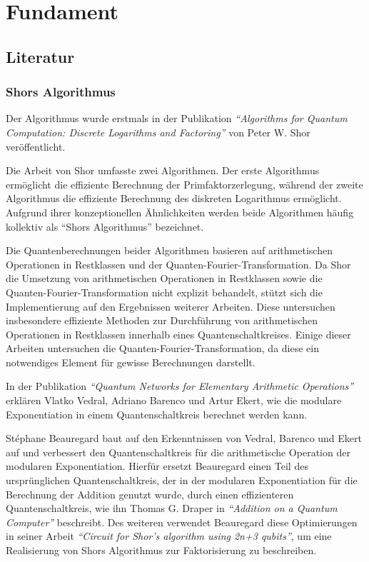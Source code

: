 \section{Fundament}
\subsection{Literatur} 
\subsubsection*{Shors Algorithmus}
Der Algorithmus wurde erstmals in der Publikation \textit{"`Algorithms for Quantum Computation: Discrete Logarithms and Factoring"'} von Peter W. Shor veröffentlicht.

Die Arbeit von Shor umfasste zwei Algorithmen.
Der erste Algorithmus ermöglicht die effiziente Berechnung der Primfaktorzerlegung, 
während der zweite Algorithmus die effiziente Berechnung des diskreten Logarithmus ermöglicht.
Aufgrund ihrer konzeptionellen Ähnlichkeiten werden beide Algorithmen häufig kollektiv als "`Shors Algorithmus"' bezeichnet.

Die Quantenberechnungen beider Algorithmen basieren auf arithmetischen Operationen in Restklassen und der Quanten-Fourier-Transformation.
Da Shor die Umsetzung von arithmetischen Operationen in Restklassen sowie die Quanten-Fourier-Transformation nicht explizit behandelt,
stützt sich die Implementierung auf den Ergebnissen weiterer Arbeiten. 
Diese untersuchen insbesondere effiziente Methoden zur Durchführung von arithmetischen Operationen in Restklassen innerhalb eines Quantenschaltkreises.
Einige dieser Arbeiten untersuchen die Quanten-Fourier-Transformation, 
da diese ein notwendiges Element für gewisse Berechnungen darstellt.

In der Publikation \textit{"`Quantum Networks for Elementary Arithmetic Operations"'} erklären Vlatko Vedral,  Adriano Barenco und Artur Ekert,
wie die modulare Exponentiation in einem Quantenschaltkreis berechnet werden kann. 

St\'{e}phane Beauregard baut auf den Erkenntnissen von Vedral, Barenco und Ekert auf und
verbessert den Quantenschaltkreis für die arithmetische Operation der modularen Exponentiation.
Hierfür ersetzt Beauregard einen Teil des ursprünglichen Quantenschaltkreis,
der in der modularen Exponentiation für die Berechnung der Addition genutzt wurde, 
durch einen effizienteren Quantenschaltkreis,
wie ihn Thomas G. Draper in \textit{"`Addition on a Quantum Computer"'} beschreibt.
Des weiteren verwendet Beauregard diese Optimierungen in seiner Arbeit \textit{"`Circuit for Shor’s algorithm using 2n+3 qubits"'},
um eine Realisierung von Shors Algorithmus zur Faktorisierung zu beschreiben.

